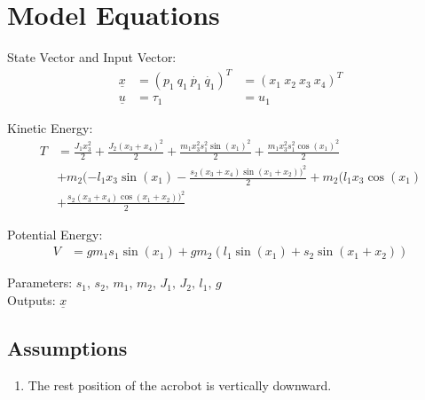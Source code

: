 \documentclass[10pt,a4paper]{article}
\begin{document}
	\begin{tabular}{ll}

	\end{tabular}
	
	
	\section{Model Equations} %
	
	State Vector and Input Vector:
	\begin{align*}
		\underline{x} &= (p_1 \ q_1 \ \dot{p_1} \ \dot{q_1})^T &= (x_1 \ x_2 \ x_3 \ x_4)^T \\
		\underline{u} &= \tau_1 &= u_1
	\end{align*}
	
	\noindent Kinetic Energy:			
	\begin{subequations}
	\begin{align*}
		T &= \frac{J_1x_3^2}{2} + \frac{J_2(x_3 + x_4)^2}{2} + \frac{m_1x_3^2s_1^2 \sin(x_1)^2}{2} + \frac{m_1x_3^2s_1^2 \cos(x_1)^2}{2} \\
		&+ m_2(-l_1x_3 \sin(x_1) - \frac{s_2(x_3 + x_4) \sin(x_1 + x_2))^2}{2} + m_2(l_1x_3 \cos(x_1) \\
		&+ \frac{s_2(x_3 + x_4) \cos(x_1 + x_2))^2}{2}
	\end{align*}
	\end{subequations}
	
	\noindent Potential Energy:			
	\begin{subequations}
	\begin{align*}
		V &= gm_1s_1\sin(x_1) + gm_2(l_1\sin(x_1) + s_2\sin(x_1 + x_2))
	\end{align*}
	\end{subequations}

	\noindent
	Parameters: $s_1, \, s_2, \, m_1, \, m_2, \, J_1 , \, J_2, \, l_1, \, g$ %
	\\
	Outputs: $\underline{x}$ %
	
	
	\subsection{Assumptions} %
		\begin{enumerate} %
			\item The rest position of the acrobot is vertically downward.  
		\end{enumerate}
	
\end{document}
